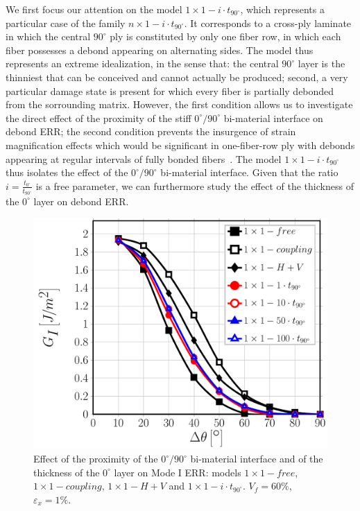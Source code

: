 \documentclass[review]{elsarticle}
\begin{document}
We first focus our attention on the model $1\times 1-i\cdot t_{90^{\circ}}$, which represents a particular case of the family $n\times 1-i\cdot t_{90^{\circ}}$. It corresponds to a cross-ply laminate in which the central $90^{\circ}$ ply is constituted by only one fiber row, in which each fiber possesses a debond appearing on alternating sides. The model thus represents an extreme idealization, in the sense that: the central $90^{\circ}$ layer is the thinniest that can be conceived and cannot actually be produced; second, a very particular damage state is present for which every fiber is partially debonded from the sorrounding matrix. However, the first condition allows us to investigate the direct effect of the proximity of the stiff $0^{\circ}/90^{\circ}$ bi-material interface on debond ERR; the second condition prevents the insurgence of strain magnification effects which would be significant in one-fiber-row ply with debonds appearing at regular intervals of fully bonded fibers~\cite{DiStasio2019}. The model $1\times 1-i\cdot t_{90^{\circ}}$ thus isolates the effect of the $0^{\circ}/90^{\circ}$ bi-material interface. Given that the ratio $i=\frac{t_{0^{\circ}}}{t_{90^{\circ}}}$ is a free parameter, we can furthermore study the effect of the thickness of the $0^{\circ}$ layer on debond ERR.

\begin{figure}[!h]
\centering
\includegraphics[width=\textwidth]{1x1-i-vf60-GI.pdf}
\caption{Effect of the proximity of the $0^{\circ}/90^{\circ}$ bi-material interface and of the thickness of the $0^{\circ}$ layer on Mode I ERR: models $1\times 1-free$, $1\times 1-coupling$, $1\times 1-H+V$ and $1\times 1-i\cdot t_{90^{\circ}}$. $V_{f}=60\%$, $\varepsilon_{x}=1\%$.}\label{fig:thicknessGI}
\end{figure}
\end{document}
